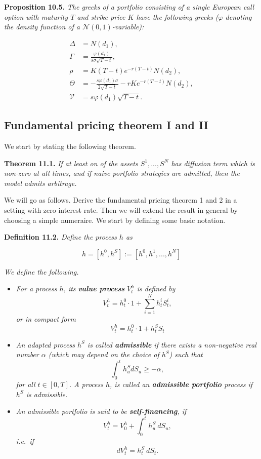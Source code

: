 \documentclass[
]{article}
\providecommand{\tightlist}{%
  \setlength{\itemsep}{0pt}\setlength{\parskip}{0pt}}
\begin{document}
\textbf{Proposition 10.5.} \emph{The greeks of a portfolio consisting of
a single European call option with maturity \(T\) and strike price \(K\)
have the following greeks (\(\varphi\) denoting the density function of
a \(\mathcal{N}(0,1)\)-variable):}

\begin{align*}
\Delta&=N(d_1),\tag{10.17}\\
\Gamma&=\frac{\varphi(d_1)}{s\sigma\sqrt{T-t}},\tag{10.18}\\
\rho&=K(T-t)e^{-r(T-t)}N(d_2),\tag{10.19}\\
\Theta&=-\frac{s\varphi(d_1)\sigma}{2\sqrt{T-t}}-rKe^{-r(T-t)}N(d_2),\tag{10.20}\\
\mathcal{V}&=s\varphi(d_1)\sqrt{T-t}\tag{10.21}.
\end{align*}

\hypertarget{fundamental-pricing-theorem-i-and-ii}{%
\subsection{Fundamental pricing theorem I and
II}\label{fundamental-pricing-theorem-i-and-ii}}

We start by stating the following theorem.

\textbf{Theorem 11.1.} \emph{If at least on of the assets
\(S^1,...,S^N\) has diffusion term which is non-zero at all times, and
if naive portfolio strategies are admitted, then the model admits
arbitrage.}

We will go as follows. Derive the fundamental pricing theorem 1 and 2 in
a setting with zero interest rate. Then we will extend the result in
general by choosing a simple numeraire. We start by defining some basic
notation.

\textbf{Definition 11.2.} \emph{Define the process \(h\) as}

\[
h=[h^0,h^S]:=[h^0,h^1,...,h^N]
\]

\emph{We define the following.}

\begin{itemize}
\tightlist
\item
  \emph{For a process \(h\), its \textbf{value process} \(V_t^h\) is
  defined by} \[
    V_t^h=h^0_t\cdot 1+\sum_{i=1}^Nh_t^iS_t^i,\tag{11.3}
    \] \emph{or in compact form} \[
    V_t^h=h_t^0\cdot 1 + h_t^S S_t\tag{11.4}
    \]
\item
  \emph{An adapted process \(h^S\) is called \textbf{admissible} if
  there exists a non-negative real number \(\alpha\) (which may depend
  on the choice of \(h^S\)) such that} \[
    \int_0^th_u^SdS_u\ge -\alpha,\tag{11.5}
    \] \emph{for all \(t\in[0,T]\). A process \(h\), is called an
  \textbf{admissible portfolio} process if \(h^S\) is admissible.}
\item
  \emph{An admissible portfolio is said to be \textbf{self-financing},
  if} \[
    V_t^h=V_0^h+\int_0^th_u^S\ dS_u,\tag{11.6}
    \] \emph{i.e.~if} \[
    dV_t^h=h_t^S\ dS_t.\tag{11.7}
    \]
\end{itemize}
\end{document}
